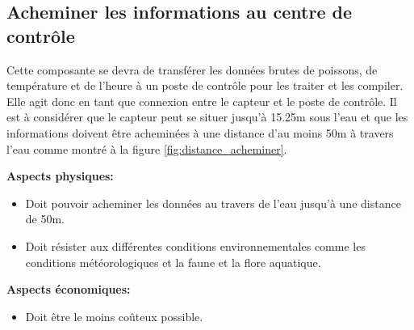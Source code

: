 \begin{table}[!htb]
\footnotesize
\centering
{}
\caption{Faisabilité des concepts pour l'alimentation du système}
\label{t:Decision_alimenter}
\end{table}

\subsection{Acheminer les informations au centre de contrôle}
Cette composante se devra de transférer les données brutes de poissons, de température et de l'heure à un poste de contrôle pour les traiter et les compiler. Elle agit donc en tant que connexion entre le capteur et le poste de contrôle. Il est à considérer que le capteur peut se situer jusqu'à 15.25m sous l'eau et que les informations doivent être acheminées à une distance d'au moins 50m à travers l'eau comme montré à la figure \ref{fig:distance_acheminer}.

 \textbf{Aspects physiques:}
 \begin{itemize} [label = {--}]
    \item Doit pouvoir acheminer les données au travers de l'eau jusqu'à une distance de 50m.
    \item Doit résister aux différentes conditions environnementales comme les conditions météorologiques et la faune et la flore aquatique.
\end{itemize}

 \textbf{Aspects économiques:}
 \begin{itemize} [label = {--}]
    \item Doit être le moins coûteux possible.
\end{itemize}

